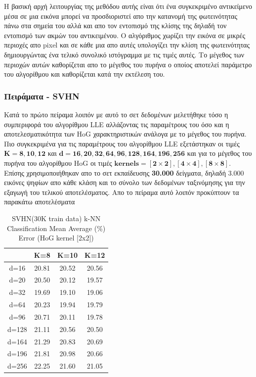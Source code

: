 \par
Η βασική αρχή λειτουργίας της μεθόδου αυτής είναι ότι ένα συγκεκριμένο αντικείμενο μέσα σε μια εικόνα μπορεί να προσδιοριστεί απο την κατανομή της φωτεινότητας πάνω στα σημεία του αλλά και απο τον εντοπισμό της κλίσης της δηλαδή τον εντοπισμό των ακμών του αντικειμένου. Ο αλγόριθμος χωρίζει την εικόνα σε μικρές περιοχές απο \textlatin{pixel} και σε κάθε μια απο αυτές υπολογίζει την κλίση της φωτεινότητας δημιουργώντας ένα τελικό συνολικό ιστόγραμμα με τις τιμές αυτές. Το μέγεθος των περιοχών αυτών καθορίζεται απο το μέγεθος του πυρήνα ο οποίος αποτελεί παράμετρο του αλγορίθμου και καθορίζεται κατά την εκτέλεση του.

\subsubsection{Πειράματα - \textlatin{SVHN}}
\par
Κατά το πρώτο πείραμα λοιπόν με αυτό το σετ δεδομένων μελετήθηκε τόσο η συμπεριφορά του αλγορίθμου \textlatin{LLE} αλλάζοντας τις παραμέτρους του όσο και η αποτελεσματικότητα των \textlatin{HoG} χαρακτηριστικών ανάλογα με το μέγεθος του πυρήνα. Πιο συγκεκριμένα για τις παραμέτρους του αλγορίθμου \textlatin{LLE} εξετάστηκαν οι τιμές $\mathbf{Κ=8,10,12}$ και $\mathbf{d=16,20,32,64,96,128,164,196,256}$ και για το μέγεθος του πυρήνα του αλγορίθμου \textlatin{HoG} οι τιμές $\mathbf{kernels=[2\times2],[4\times4],[8\times8]}$. Επίσης χρησιμοποιήθηκαν απο το σετ εκπαίδευσης \textbf{30.000} δείγματα, δηλαδή 3.000 εικόνες ψηφίων απο κάθε κλάση και το σύνολο των δεδομένων ταξινόμησης για την εξαγωγή του τελικού αποτελέσματος. Απο το πείραμα αυτό λοιπόν προκύπτουν τα παρακάτω αποτελέσματα
\begin{table}[H]
\centering
\label{tab:table11}
\begin{tabular}{|c|c|c|c|}
\hline
 & K=8 & K=10 & K=12 \\
\hline
d=16 & 20.81 & 20.52 & 20.56 \\
d=20 & 20.50 & 20.12 & 19.57 \\
d=32 & 19.69 & 19.10 & 19.06 \\
d=64 & 20.23 & 19.94 & 19.79 \\
d=96 & 20.71 & 20.11 & 19.78 \\
d=128 & 21.11 & 20.56 & 20.50 \\
d=164 & 21.29 & 20.83 & 20.69 \\
d=196 & 21.81 & 20.98 & 20.66 \\
d=256 & 22.25 & 21.60 & 21.05 \\
\hline
\end{tabular}
\caption{SVHN(30K train data) k-NN Classification Mean Average (\%) Error (HoG kernel [2x2])}
\end{table}


